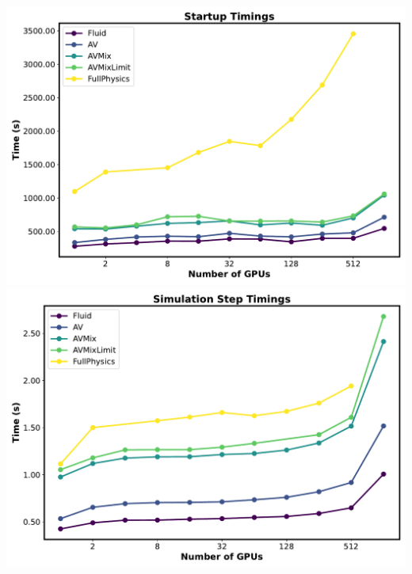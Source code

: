 \begin{columns}[T]
    \begin{column}{0.5\textwidth}
      \includegraphics[width=\textwidth]{Figures/StartupTimes.pdf}
      \includegraphics[width=\textwidth]{Figures/SimulationStepTimes.pdf}
    \end{column}
  \end{columns}
